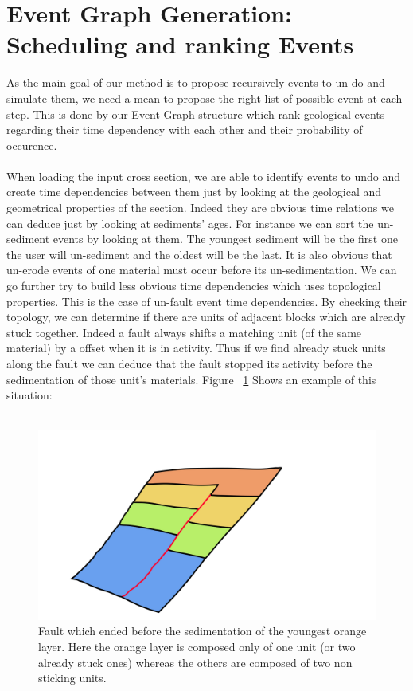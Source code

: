 \documentclass[12pt, a4paper]{report} %
\begin{document}
\section{Event Graph Generation: Scheduling and ranking Events}
\label{sec:eventgraph}
As the main goal of our method is to propose recursively events to un-do and simulate them, we need a mean to propose the right list of possible event at each step. This is done by our Event Graph structure which rank geological events regarding their time dependency with each other and their probability of occurence.\\\\
When loading the input cross section, we are able to identify events to undo and create time dependencies between them just by looking at the geological and geometrical properties of the section. Indeed they are obvious time relations we can deduce just by looking at sediments' ages. For instance we can sort the un-sediment events by looking at them. The youngest sediment will be the first one the user will un-sediment and the oldest will be the last. It is also obvious that un-erode events of one material must occur before its un-sedimentation. 
We can go further try to build less obvious time dependencies which uses topological properties. This is the case of un-fault event time dependencies. By checking their topology, we can determine if there are units of adjacent blocks which are already stuck together. Indeed a fault always shifts a matching unit (of the same material) by a offset when it is in activity. Thus if we find already stuck units along the fault we can deduce that the fault stopped its activity before the sedimentation of those unit's materials. Figure ~\ref{faultstick} Shows an example of this situation:\\\\
	\begin{figure}[H]
	\centering
	\includegraphics[scale=0.5]{unFaultSedDescription.png}
	\caption{Fault which ended before the sedimentation of the youngest orange layer. Here the orange layer is composed only of one unit (or two already stuck ones) whereas the others are composed of two non sticking units.}
	\label{faultstick}
	\end{figure}
	
\end{document}
